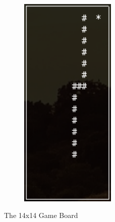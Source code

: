 \documentclass{article}
\begin{document}
\begin{figure}[h]
\begin{subfigure}{0.4\textwidth}
\includegraphics[width=0.5\textwidth]{Figures/game_board_2}
\label{fig:game_board_2}
\end{subfigure}

\caption{The 14x14 Game Board}
\label{fig:game_board}
\end{figure}
 
\end{document}
